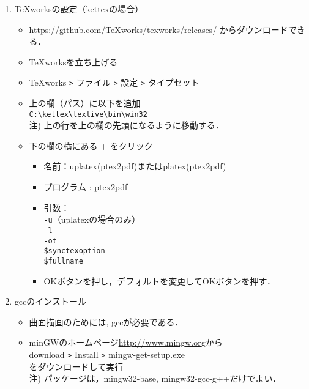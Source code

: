 \documentclass{ujarticle}
\begin{document}
\begin{enumerate}[\bf\large 1.]
\item TeXworksの設定（kettexの場合）
  \begin{itemize}
  \item \url{https://github.com/TeXworks/texworks/releases/} からダウンロードできる．
  \item TeXworksを立ち上げる
  \item TeXworks \verb|>| ファイル \verb|>| 設定 \verb|>| タイプセット
  \item 上の欄（パス）に以下を追加\\
  \hspace*{5mm}\verb|C:\kettex\texlive\bin\win32|\\
  \hspace*{10mm}注) 上の行を上の欄の先頭になるように移動する．
  \item 下の欄の横にある + をクリック
    \begin{itemize}
    \item 名前：uplatex(ptex2pdf)またはplatex(ptex2pdf)
    \item プログラム : ptex2pdf
    \item 引数：\\
    \hspace*{10mm} \verb|-u|（uplatexの場合のみ）\\
    \hspace*{10mm} \verb|-l|\\
    \hspace*{10mm} \verb|-ot|\\
    \hspace*{10mm}  \verb|$synctexoption|\\
    \hspace*{10mm}  \verb|$fullname|
    \item[]OKボタンを押し，デフォルトを変更してOKボタンを押す．
    \end{itemize}
  \end{itemize}
\item gccのインストール
  \begin{itemize}
    \item 曲面描画のためには, gccが必要である．
    \item minGWのホームページ\url{http://www.mingw.org}から\\
    \hspace*{10mm}download \verb|>| Install \verb|>| mingw-get-setup.exe\\
    をダウンロードして実行\\
    \hspace*{10mm}注) パッケージは，mingw32-base, mingw32-gcc-g++だけでよい．
  \end{itemize}
\end{enumerate}
\end{document}
